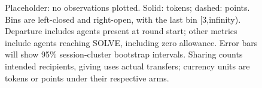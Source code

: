 \begin{figure}[H]
\caption{Placeholder: no observations plotted. Solid: tokens; dashed: points. Bins are left-closed and right-open, with the last bin [3,infinity). Departure includes agents present at round start; other metrics include agents reaching SOLVE, including zero allowance. Error bars will show 95\% session-cluster bootstrap intervals. Sharing counts intended recipients, giving uses actual transfers; currency units are tokens or points under their respective arms.}
\label{fig:e52-behavior}
\end{figure}
